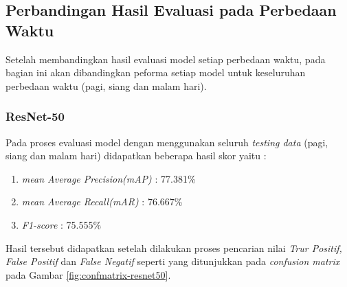 \begin{table}[H]
	\label{tab:video-night}
\end{table}


\subsection{Perbandingan Hasil Evaluasi pada Perbedaan Waktu}
\label{subsec:compare-eval}

Setelah membandingkan hasil evaluasi model setiap perbedaan waktu, pada bagian ini akan dibandingkan peforma setiap model untuk keseluruhan perbedaan waktu (pagi, siang dan malam hari). 

\subsubsection{ResNet-50}

Pada proses evaluasi model dengan menggunakan seluruh \textit{testing data} (pagi, siang dan malam hari) didapatkan beberapa hasil skor yaitu :
\begin{enumerate}[nolistsep]
	\item \textit{mean Average Precision(mAP)} : 77.381\%
	\item \textit{mean Average Recall(mAR)} : 76.667\%
	\item \textit{F1-score} : 75.555\%
\end{enumerate}
Hasil tersebut didapatkan setelah dilakukan proses pencarian nilai \textit{Trur Positif, False Positif} dan \textit{False Negatif} seperti yang ditunjukkan pada \textit{confusion matrix} pada Gambar \ref{fig:confmatrix-resnet50}.

